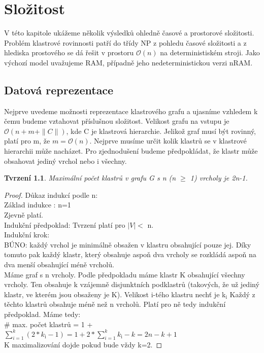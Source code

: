\documentclass[12pt,a4report]{report}
\newtheorem{tvr1}{Tvrzení}
\begin{document}
\author{Filip Šedivý}


\chapter{Složitost}
\par
V této kapitole ukážeme několik výsledků ohledně časové a prostorové složitosti.
Problém klastrové rovinnosti patří do třídy NP z pohledu časové složitosti a z hlediska prostového se dá řešit v prostoru $\mathcal{O}(n)$ na deterministiském stroji. Jako výchozí model uvažujeme RAM, případně jeho nedeterministickou verzi nRAM.

\section{Datová reprezentace}
Nejprve uvedeme možnosti reprezentace klastrového grafu a ujasníme vzhledem k čemu budeme vztahovat příslušnou složitost. 
Velikost grafu na vstupu je  $\mathcal{O}(n+m+\|C\|)$, kde C je klastrová hierarchie. 
Jelikož graf musí být rovinný, platí pro m, že $m=\mathcal{O}(n)$.
Nejprve musíme určit kolik klastrů se v klastrové hierarchii může nacházet.
Pro zjednodušení budeme předpokládat, že klastr může obsahovat jediný vrchol nebo i všechny.
\begin{tvr1}
Maximální počet klastrů v grafu G s n (n $\geq$ 1) vrcholy je 2n-1.
\end{tvr1}
\begin{proof}
Důkaz indukcí podle n: \\
Základ indukce : n=1 \\
Zjevně platí. \\
Indukční předpoklad: Tvrzení platí pro $|V| <$ n.\\
Indukční krok:  \\
BÚNO: každý vrchol je minimálně obsažen v klastru obsahující pouze jej.
Díky tomuto pak každý klastr, který obsahuje aspoň dva vrcholy se rozkládá aspoň na dva menší obsahující méně vrcholů. \\
Máme graf s n vrcholy. Podle předpokladu máme klastr K obsahující všechny vrcholy. Ten obsahuje k vzájemně disjunktních podklastrů (takových, že už jediný klastr, ve kterém jsou obsaženy je K). Velikost i-tého klastru nechť je k$_{\text{i}}$ Každý z těchto klastrů obsahuje méně než n vrcholů. Platí pro ně tedy indukční předpoklad. Máme tedy: \\
$\#$ max. počet klastrů = 1 + $\sum\limits_{i=1}^k (2*k_{\text{i}}-1) = 1 + 2*\sum\limits_{i=1}^k k_{\text{i}} - k = 2n - k + 1 $\\
K maximalizování dojde pokud bude vždy k=2.
\end{proof}
\end{document}
